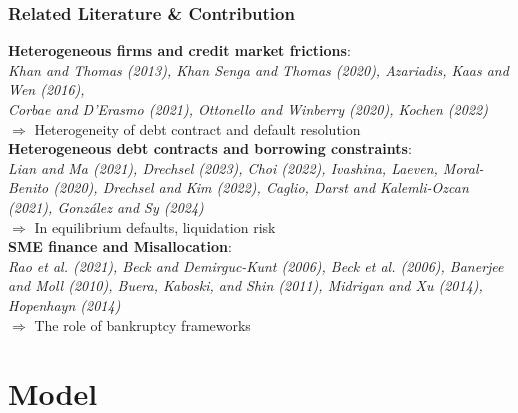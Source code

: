 \documentclass[aspectratio=169,xcolor=table]{beamer}
\begin{document}
\begin{frame}[label=lit] \frametitle{Related Literature \& \textcolor{primary}{Contribution} }

\textbf{Heterogeneous firms and credit market frictions}: \\
\footnotesize \textit{Khan and Thomas (2013), Khan Senga and Thomas (2020), Azariadis, Kaas and Wen (2016), \\ Corbae and D'Erasmo (2021), Ottonello and Winberry (2020), Kochen (2022)} \normalsize \\ 
\qquad $\Rightarrow$ \textcolor{primary}{Heterogeneity of debt contract and default resolution} \vspace{3mm} \\

\textbf{Heterogeneous debt contracts and borrowing constraints}: \\
\footnotesize \textit{Lian and Ma (2021), Drechsel (2023), Choi (2022),  Ivashina, Laeven, Moral-Benito (2020), Drechsel and Kim (2022), Caglio, Darst and Kalemli-Ozcan (2021), González and Sy (2024)} \normalsize \\ 
\qquad $\Rightarrow$ \textcolor{primary}{In equilibrium defaults, liquidation risk}\vspace{3mm} \\

\textbf{SME finance and Misallocation}: \\
\footnotesize \textit{Rao et al. (2021), Beck and Demirguc-Kunt (2006), Beck et al. (2006), Banerjee and Moll (2010), Buera, Kaboski, and Shin (2011), Midrigan and Xu (2014), Hopenhayn (2014)} \\ \normalsize 
\qquad $\Rightarrow$ \textcolor{primary}{The role of bankruptcy frameworks}

\end{frame} 

\section{Model}
\end{document}
